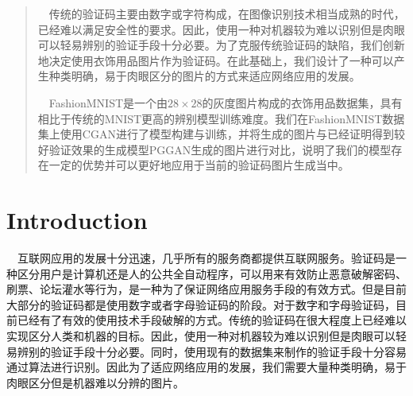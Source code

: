 \documentclass[portrait]{a0poster}
\begin{document}
\begin{multicols}{2} %


\color{Navy} %
\begin{CJK}{UTF8}{gbsn}
\begin{abstract}
\ \ 传统的验证码主要由数字或字符构成，在图像识别技术相当成熟的时代，已经难以满足安全性的要求。因此，使用一种对机器较为难以识别但是肉眼可以轻易辨别的验证手段十分必要。为了克服传统验证码的缺陷，我们创新地决定使用衣饰用品图片作为验证码。在此基础上，我们设计了一种可以产生种类明确，易于肉眼区分的图片的方式来适应网络应用的发展。

\ \ FashionMNIST\supercite{DBLP}是一个由$28\times 28$的灰度图片构成的衣饰用品数据集，具有相比于传统的MNIST更高的辨别模型训练难度。我们在FashionMNIST数据集上使用CGAN进行了模型构建与训练，并将生成的图片与已经证明得到较好验证效果的生成模型PGGAN\supercite{DBLP:journals/corr/abs-1710-10196}生成的图片进行对比，说明了我们的模型存在一定的优势并可以更好地应用于当前的验证码图片生成当中。
\end{abstract}
\end{CJK}

\color{SaddleBrown} %

\section*{Introduction}
\begin{CJK}{UTF8}{gbsn}

\ \ 互联网应用的发展十分迅速，几乎所有的服务商都提供互联网服务。验证码是一种区分用户是计算机还是人的公共全自动程序，可以用来有效防止恶意破解密码、刷票、论坛灌水等行为，是一种为了保证网络应用服务手段的有效方式。但是目前大部分的验证码都是使用数字或者字母验证码的阶段。对于数字和字母验证码，目前已经有了有效的使用技术手段破解的方式\supercite{10.1007}。传统的验证码在很大程度上已经难以实现区分人类和机器的目标。因此，使用一种对机器较为难以识别但是肉眼可以轻易辨别的验证手段十分必要。同时，使用现有的数据集来制作的验证手段十分容易通过算法进行识别。因此为了适应网络应用的发展，我们需要大量种类明确，易于肉眼区分但是机器难以分辨的图片。


\end{CJK}
\end{multicols}
\end{document}
